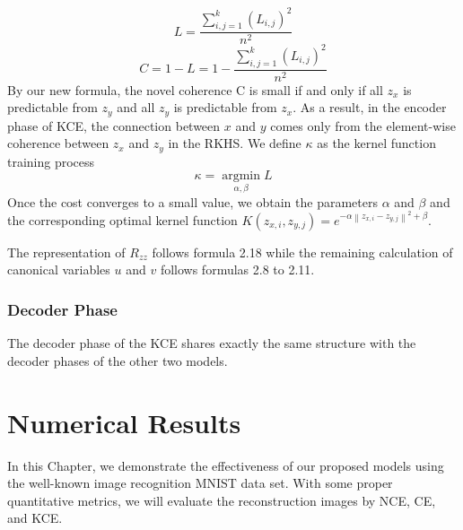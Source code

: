 \documentclass[12pt]{report} %
\newcommand{\norm}[1]{\left\lVert #1 \right\rVert}
\begin{document}
\begin{equation}
L=\frac{\sum_{i,j=1}^{k}(L_{i,j})^2}{n^2}
\end{equation}
\begin{equation}
C=1-L=1-\frac{\sum_{i,j=1}^{k}(L_{i,j})^2}{n^2}
\end{equation}
By our new formula, the novel coherence C is small if and only if all $z_x$ is predictable from $z_y$ and all $z_y$ is predictable from $z_x$. As a result, in the encoder phase of KCE, the connection between $x$ and $y$ comes only from the element-wise coherence between $z_x$ and $z_y$ in the RKHS. We define $\kappa$ as the kernel function training process
\begin{equation}
\kappa=\operatorname*{argmin}_{\alpha,\beta} L
\end{equation}
Once the cost converges to a small value, we obtain the parameters $\alpha$ and $\beta$ and the corresponding optimal kernel function $K(z_{x,i},z_{y,j})=e^{-\alpha \norm{z_{x,i}-z_{y,j}}^2 + \beta}$.

The representation of $R_{zz}$ follows formula 2.18 while the remaining calculation of canonical variables $u$ and $v$ follows formulas 2.8 to 2.11.

\subsection{Decoder Phase}
The decoder phase of the KCE shares exactly the same structure with the decoder phases of the other two models. 

\chapter{Numerical Results}
In this Chapter, we demonstrate the effectiveness of our proposed models using the well-known image recognition MNIST data set. With some proper quantitative metrics, we will evaluate the reconstruction images by NCE, CE, and KCE. 
\end{document}

